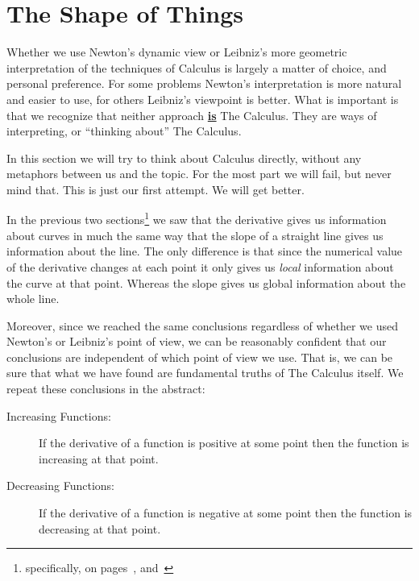 \section{The Shape of Things}
\label{sec:optim-shape-things}
Whether we use Newton's dynamic view or Leibniz's more geometric
interpretation of the techniques of Calculus is largely a matter of
choice, and personal preference. For some problems Newton's
interpretation is more natural and easier to use, for others Leibniz's
viewpoint is better. What is important is that we recognize that
neither approach \underline{\bf{}is} The Calculus. They are ways of
interpreting, or ``thinking about'' The Calculus. 

In this section we will try to think about Calculus directly, without
any metaphors between us and the topic. For the most part we will
fail, but never mind that. This is just our first attempt. We will get
better.
 
In the previous two sections\footnote{specifically, on
pages~\pageref{list:FirstDerivTest-Newton},
\pageref{list:FirstDerivTest-Lines}
and~\pageref{list:FirstDerivTest-Leibniz}} we saw that the derivative
gives us information about curves in much the same way that the slope
of a straight line gives us information about the line. The only
difference is that since the numerical value of the derivative changes
at each point it only gives us \emph{local} information about the
curve at that point. Whereas the slope gives us global information
about the whole line.

Moreover, since we reached the same conclusions regardless of whether
we used Newton's or Leibniz's point of view, we can be reasonably
confident that our conclusions are independent of which point of view we
use. That is, we can be sure that what we have found  are fundamental
truths of The Calculus itself. We repeat these conclusions in the
abstract:
\begin{description}
\item[Increasing Functions:] If the derivative of a function is
  positive at some point then the function is increasing at that
  point.
\item[Decreasing Functions:] If the derivative of a function is
  negative at some point then the function is decreasing at that
  point. 
\end{description}

